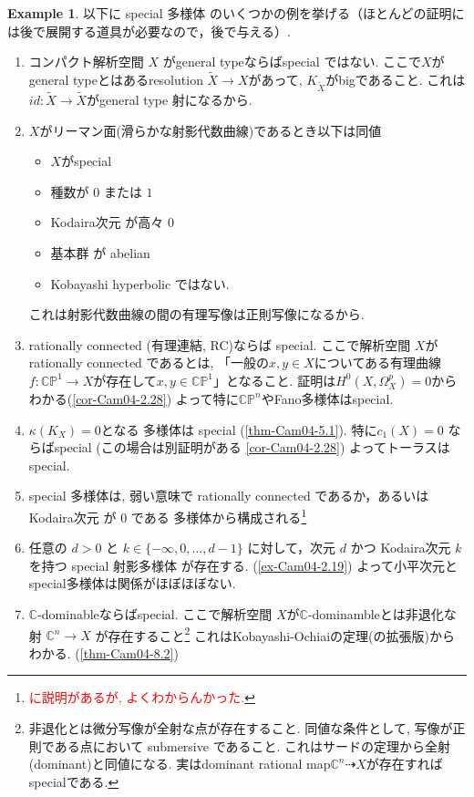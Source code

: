 \documentclass[dvipdfmx,a4paper,11pt]{article} %
\theoremstyle{definition}
\newtheorem{ex}[thm]{Example}
\theoremstyle{remark}
\numberwithin{equation}{section}
\newcommand{\C}{\mathbb{C}}
\newcommand{\xr}[1]{\textcolor{red}{#1}}
\begin{document}
\begin{ex}\cite[Example 2.3]{Cam04}
以下に special 多様体 のいくつかの例を挙げる（ほとんどの証明には後で展開する道具が必要なので，後で与える）.

\begin{enumerate}
\item[0.] 
コンパクト解析空間 $X$ がgeneral typeならばspecial ではない. 
ここで$X$がgeneral typeとはあるresolution $\widetilde{X} \to X$があって, $K_{\widetilde{X}}$がbigであること. これは$id : \widetilde{X} \to \widetilde{X}$がgeneral type 射になるから. 
\item[1.] $X$がリーマン面(滑らかな射影代数曲線)であるとき以下は同値
\begin{itemize}
\item $X$がspecial
\item 種数が \(0\) または \(1\) 
\item Kodaira次元 が高々 \(0\) 
\item  基本群 が abelian
\item Kobayashi hyperbolic ではない.
\end{itemize}
これは射影代数曲線の間の有理写像は正則写像になるから. 
\item[2.] rationally connected (有理連結, RC)ならば special. 
ここで解析空間 $X$がrationally connected であるとは, 「一般の$x, y \in X$についてある有理曲線$f : \C\mathbb{P}^1 \to X$が存在して$x, y \in \C\mathbb{P}^1$」となること. 
証明は$H^0(X, \Omega_{X}^{p})=0$からわかる(\ref{cor-Cam04-2.28})
よって特に$\C\mathbb{P}^n$やFano多様体はspecial.
\item[3.] \(\kappa(K_X)=0\)となる 多様体は special (\ref{thm-Cam04-5.1}). 
特に\(c_1(X)=0\) ならばspecial (この場合は別証明がある \ref{cor-Cam04-2.28}) よってトーラスはspecial.
\item[4.] special 多様体は, 弱い意味で rationally connected であるか，あるいは Kodaira次元 が \(0\) である 多様体から構成される\footnote{\xr{\cite[Section 6.5]{Cam04} に説明があるが, よくわからんかった.}}
\item[5.] 任意の \(d>0\) と \(k\in\{-\infty,0,\dots,d-1\}\) に対して，次元 \(d\) かつ Kodaira次元 \(k\) を持つ special 射影多様体 が存在する. (\ref{ex-Cam04-2.19}) 
よって小平次元とspecial多様体は関係がほぼほぼない. 
\item[6.] $\C$-dominableならばspecial. ここで解析空間 $X$が$\C$-dominambleとは非退化な  射 \(\mathbb C^n \rightarrow X\) が存在すること\footnote{非退化とは微分写像が全射な点が存在すること. 同値な条件として, 写像が正則である点において submersive であること. これはサードの定理から全射(dominant)と同値になる. 実はdominant rational map\(\mathbb C^n \dashrightarrow X\)が存在すればspecialである. } これはKobayashi-Ochiaiの定理(の拡張版)からわかる. (\ref{thm-Cam04-8.2})

\end{enumerate}
\end{ex}
\end{document}
